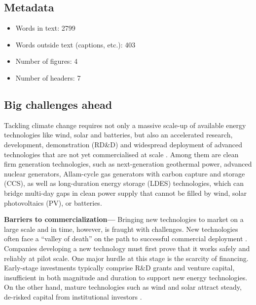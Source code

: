 \documentclass[pdflatex,sn-basic, Numbered]{sn-jnl}
\theoremstyle{thmstyleone}%
\theoremstyle{thmstyletwo}%
\theoremstyle{thmstylethree}%
\begin{document}
\subsection*{Metadata}
\begin{itemize}
    \item Words in text: 2799
    \item Words outside text (captions, etc.): 403
    \item Number of figures: 4
    \item Number of headers: 7
\end{itemize}



\maketitle

\subsection*{Big challenges ahead}\label{sec1}

Tackling climate change requires not only a massive scale-up of available energy technologies like wind, solar and batteries, but also an accelerated research, development, demonstration (RD\&D) and widespread deployment of advanced technologies that are not yet commercialised at scale \cite{sepulvedaRoleFirmLowCarbon2018, bistlineImpactCarbonDioxide2021, brownUltralongdurationEnergyStorage2023, ieaNetZero20502021}.
Among them are clean firm generation technologies, such as next-generation geothermal power, advanced nuclear generators, Allam-cycle gas generators with carbon capture and storage (CCS), as well as long-duration energy storage (LDES) technologies, which can bridge multi-day gaps in clean power supply that cannot be filled by wind, solar photovoltaics (PV), or batteries.

\textbf{Barriers to commercialization---} Bringing new technologies to market on a large scale and in time, however, is fraught with challenges.
New technologies often face a \enquote{valley of death} on the path to successful commercial deployment \cite{gatesFinancingCleanIndustrial2021, google-advancedtech}.
Companies developing a new technology must first prove that it works safely and reliably at pilot scale.
One major hurdle at this stage is the scarcity of financing. Early-stage investments typically comprise R\&D grants and venture capital, insufficient in both magnitude and duration to support new energy technologies. On the other hand, mature technologies such as wind and solar attract steady, de-risked capital from institutional investors \cite{google-advancedtech, khatcherianBarriersTimelyDeployment2022}.
\end{document}
